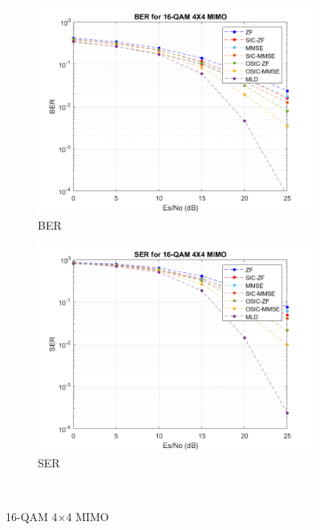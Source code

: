 \documentclass{article}
\begin{document}
\begin{figure}[H]
	\centering
	\begin{subfigure}{0.5\textwidth}
		\centerline{\includegraphics[width=1\textwidth]{BER_4x4_16qam.png}}
		\caption{BER}
	\end{subfigure}%
	\begin{subfigure}{0.5\textwidth}
		\centerline{\includegraphics[width=1\textwidth]{SER_4x4_16qam.png}}
		\caption{SER}
	\end{subfigure}\\%
	\caption{16-QAM 4$\times$4 MIMO}
\end{figure}
\end{document}
